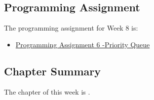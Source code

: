 \subsection{Programming Assignment}

The programming assignment for Week 8 is:

\begin{itemize}
    \item \href{https://github.com/QuantumCompiler/CU/tree/main/CSPB%202270%20-%20Data%20Structures/CSPB%202270%20-%20Programming%20Assignments/CSPB%202270%20-%20Assignment%206%20-%20Priority%20Queue}{Programming Assignment 6 -Priority Queue}
\end{itemize}

\subsection{Chapter Summary}

The chapter of this week is .

